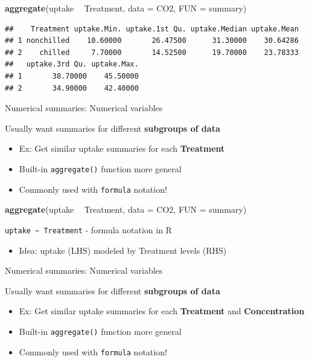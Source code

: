 \documentclass[
]{book}
\newenvironment{Shaded}{\begin{snugshade}}{\end{snugshade}}
\newcommand{\DataTypeTok}[1]{\textcolor[rgb]{0.13,0.29,0.53}{#1}}
\newcommand{\KeywordTok}[1]{\textcolor[rgb]{0.13,0.29,0.53}{\textbf{#1}}}
\newcommand{\NormalTok}[1]{#1}
\newcommand{\OperatorTok}[1]{\textcolor[rgb]{0.81,0.36,0.00}{\textbf{#1}}}
\newcommand{\StringTok}[1]{\textcolor[rgb]{0.31,0.60,0.02}{#1}}
\providecommand{\tightlist}{%
  \setlength{\itemsep}{0pt}\setlength{\parskip}{0pt}}
\theoremstyle{definition}
\theoremstyle{definition}
\theoremstyle{definition}
\theoremstyle{remark}
\begin{document}
\begin{Shaded}
\begin{Highlighting}[]
\KeywordTok{aggregate}\NormalTok{(uptake }\OperatorTok{~}\StringTok{ }\NormalTok{Treatment, }\DataTypeTok{data =}\NormalTok{ CO2, }\DataTypeTok{FUN =}\NormalTok{ summary)}
\end{Highlighting}
\end{Shaded}

\begin{verbatim}
##    Treatment uptake.Min. uptake.1st Qu. uptake.Median uptake.Mean
## 1 nonchilled    10.60000       26.47500      31.30000    30.64286
## 2    chilled     7.70000       14.52500      19.70000    23.78333
##   uptake.3rd Qu. uptake.Max.
## 1       38.70000    45.50000
## 2       34.90000    42.40000
\end{verbatim}

Numerical summaries: Numerical variables

Usually want summaries for different \textbf{subgroups of data}

\begin{itemize}
\item
  Ex: Get similar uptake summaries for each \textbf{Treatment}
\item
  Built-in \texttt{aggregate()} function more general
\item
  Commonly used with \texttt{formula} notation!
\end{itemize}

\begin{Shaded}
\begin{Highlighting}[]
\KeywordTok{aggregate}\NormalTok{(uptake }\OperatorTok{~}\StringTok{ }\NormalTok{Treatment, }\DataTypeTok{data =}\NormalTok{ CO2, }\DataTypeTok{FUN =}\NormalTok{ summary)}
\end{Highlighting}
\end{Shaded}

\texttt{uptake\ \textasciitilde{}\ Treatment} - formula notation in R

\begin{itemize}
\tightlist
\item
  Idea: uptake (LHS) modeled by Treatment levels (RHS)
\end{itemize}

Numerical summaries: Numerical variables

Usually want summaries for different \textbf{subgroups of data}

\begin{itemize}
\item
  Ex: Get similar uptake summaries for each \textbf{Treatment} and \textbf{Concentration}
\item
  Built-in \texttt{aggregate()} function more general
\item
  Commonly used with \texttt{formula} notation!
\end{itemize}
\end{document}
